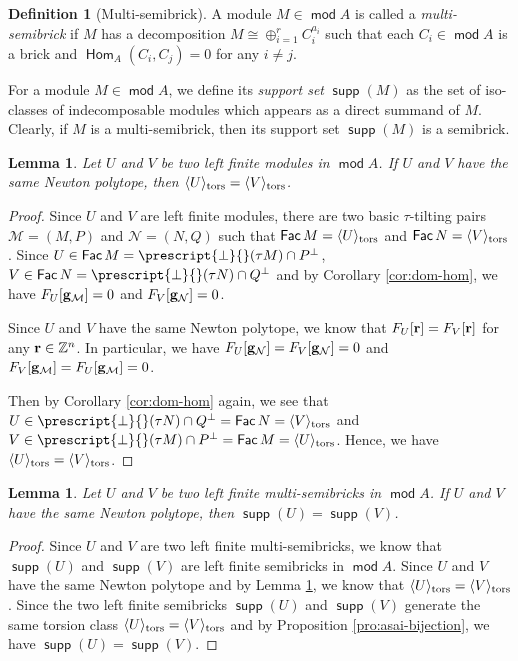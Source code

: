 \documentclass[10pt]{amsart}
\newtheorem{lemma}[theorem]{Lemma}
\theoremstyle{definition}
\newtheorem{definition}[theorem]{Definition}
\theoremstyle{remark}
\numberwithin{equation}{section}
\def\mod{\opname{mod}\nolimits}
\newcommand{\opname}[1]{\operatorname{\mathsf{#1}}}
\newcommand{\Fac}{\opname{Fac}}
\newcommand{\Hom}{\opname{Hom}}
\newcommand{\supp}{\opname{supp}}
\begin{document}
\begin{definition}[Multi-semibrick]
A module $M\in \mod A$ is called a {\em multi-semibrick} if
$M$ has a decomposition $M\cong \oplus_{i=1}^rC_i^{a_i}$ such that each $C_i\in\mod A$ is a brick and $\Hom_A(C_i,C_j)=0$ for any $i\neq j$. 
\end{definition}

For a module $M\in\mod A$, we define its {\em support set}  $\supp(M)$ as the set of iso-classes of indecomposable modules which appears as a direct summand of $M$. Clearly, if $M$ is a multi-semibrick, then its support set $\supp(M)$ is a semibrick.



\begin{lemma}\label{lem:UV-torsion}
    Let $U$ and $V$ be two left finite modules in $\mod A$. If $U$ and $V$ have the same Newton polytope, then $\langle U\rangle_{\rm tors}=\langle V\rangle_{\rm tors}$.
\end{lemma}
\begin{proof}
 Since $U$ and $V$ are left finite modules, there are two basic $\tau$-tilting pairs $\mathcal M=(M,P)$ and $\mathcal N=(N, Q)$ such that $\Fac M=\langle U\rangle_{\rm tors}$ and $\Fac N=\langle V\rangle_{\rm tors}$.
 Since $U\in\Fac M=\prescript{\bot}{}(\tau M)\cap P^{\bot}$, $V\in\Fac N=\prescript{\bot}{}(\tau N)\cap Q^{\bot}$ and
 by Corollary \ref{cor:dom-hom}, we have $F_U[{\bf g}_{\mathcal M}]=0$ and $F_V[{\bf g}_{\mathcal N}]=0$.

 Since $U$ and $V$ have the same Newton polytope, we know that $F_U[{\bf r}]=F_V[{\bf r}]$ for any ${\bf r}\in\mathbb Z^n$. In particular, we have $F_U[{\bf g}_{\mathcal N}]=F_V[{\bf g}_{\mathcal N}]=0$ and $F_V[{\bf g}_{\mathcal M}]=F_U[{\bf g}_{\mathcal M}]=0$.

 Then by Corollary \ref{cor:dom-hom} again, we see that $U\in \prescript{\bot}{}(\tau N)\cap Q^{\bot}=\Fac N=\langle V\rangle_{\rm tors}$ and $V\in \prescript{\bot}{}(\tau M)\cap P^{\bot}=\Fac M=\langle U\rangle_{\rm tors}$. Hence, we have $\langle U\rangle_{\rm tors}=\langle V\rangle_{\rm tors}$.
\end{proof}

\begin{lemma}\label{lem:UV-semibrick}
    Let $U$ and $V$ be two left finite multi-semibricks in $\mod A$. If $U$ and $V$ have the same Newton polytope, then $\supp(U)=\supp(V)$.
\end{lemma}

\begin{proof}
Since $U$ and $V$ are two left finite multi-semibricks, we know that $\supp(U)$ and $\supp(V)$ are left finite semibricks in $\mod A$. Since $U$ and $V$ have the same Newton polytope and by Lemma \ref{lem:UV-torsion}, we know that  $\langle U\rangle_{\rm tors}=\langle V\rangle_{\rm tors}$. Since the two left finite semibricks $\supp(U)$ and $\supp(V)$ generate the same torsion class $\langle U\rangle_{\rm tors}=\langle V\rangle_{\rm tors}$ and by Proposition \ref{pro:asai-bijection}, we have $\supp(U)=\supp(V)$.
\end{proof}
\end{document}
